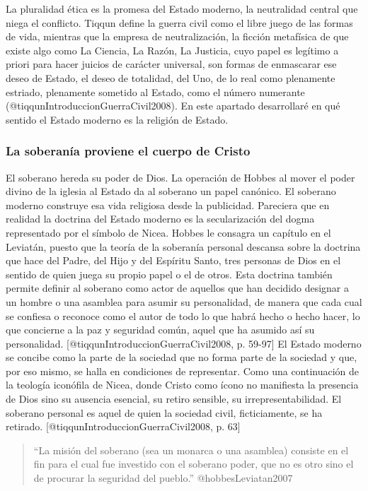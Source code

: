 \documentclass[
]{article}
\begin{document}
La pluralidad ética es la promesa del Estado moderno, la neutralidad
central que niega el conflicto. Tiqqun define la guerra civil como el
libre juego de las formas de vida, mientras que la empresa de
neutralización, la ficción metafísica de que existe algo como La
Ciencia, La Razón, La Justicia, cuyo papel es legítimo a priori para
hacer juicios de carácter universal, son formas de enmascarar ese deseo
de Estado, el deseo de totalidad, del Uno, de lo real como plenamente
estriado, plenamente sometido al Estado, como el número numerante
(@tiqqunIntroduccionGuerraCivil2008). En este apartado desarrollaré en
qué sentido el Estado moderno es la religión de Estado.

\hypertarget{la-soberanuxeda-proviene-el-cuerpo-de-cristo}{%
\subsubsection{La soberanía proviene el cuerpo de
Cristo}\label{la-soberanuxeda-proviene-el-cuerpo-de-cristo}}

El soberano hereda su poder de Dios. La operación de Hobbes al mover el
poder divino de la iglesia al Estado da al soberano un papel canónico.
El soberano moderno construye esa vida religiosa desde la publicidad.
Pareciera que en realidad la doctrina del Estado moderno es la
secularización del dogma representado por el símbolo de Nicea. Hobbes le
consagra un capítulo en el Leviatán, puesto que la teoría de la
soberanía personal descansa sobre la doctrina que hace del Padre, del
Hijo y del Espíritu Santo, tres personas de Dios en el sentido de quien
juega su propio papel o el de otros. Esta doctrina también permite
definir al soberano como actor de aquellos que han decidido designar a
un hombre o una asamblea para asumir su personalidad, de manera que cada
cual se confiesa o reconoce como el autor de todo lo que habrá hecho o
hecho hacer, lo que concierne a la paz y seguridad común, aquel que ha
asumido así su personalidad. {[}@tiqqunIntroduccionGuerraCivil2008, p.
59-97{]} El Estado moderno se concibe como la parte de la sociedad que
no forma parte de la sociedad y que, por eso mismo, se halla en
condiciones de representar. Como una continuación de la teología
iconófila de Nicea, donde Cristo como ícono no manifiesta la presencia
de Dios sino su ausencia esencial, su retiro sensible, su
irrepresentabilidad. El soberano personal es aquel de quien la sociedad
civil, ficticiamente, se ha retirado.
{[}@tiqqunIntroduccionGuerraCivil2008, p. 63{]}

\begin{quote}
``La misión del soberano (sea un monarca o una asamblea) consiste en el
fin para el cual fue investido con el soberano poder, que no es otro
sino el de procurar la seguridad del pueblo.'' @hobbesLeviatan2007
\end{quote}
\end{document}
